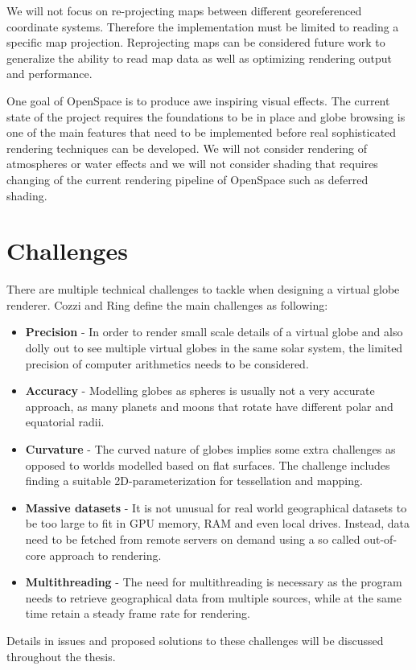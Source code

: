 We will not focus on re-projecting maps between different georeferenced coordinate systems. Therefore the implementation must be limited to reading a specific map projection. Reprojecting maps can be considered future work to generalize the ability to read map data as well as optimizing rendering output and performance.

One goal of OpenSpace is to produce awe inspiring visual effects. The current state of the project requires the foundations to be in place and globe browsing is one of the main features that need to be implemented before real sophisticated rendering techniques can be developed. We will not consider rendering of atmospheres or water effects and we will not consider shading that requires changing of the current rendering pipeline of OpenSpace such as deferred shading.

\section{Challenges}

There are multiple technical challenges to tackle when designing a virtual globe renderer. Cozzi and Ring \cite{cozzi11} define the main challenges as following:

\begin{itemize}

\item \textbf{Precision} - In order to render small scale details of a virtual globe and also dolly out to see multiple virtual globes in the same solar system, the limited precision of computer arithmetics needs to be considered.
\item \textbf{Accuracy} - Modelling globes as spheres is usually not a very accurate approach, as many planets and moons that rotate have different polar and equatorial radii.
\item \textbf{Curvature} - The curved nature of globes implies some extra challenges as opposed to worlds modelled based on flat surfaces. The challenge includes finding a suitable 2D-parameterization for tessellation and mapping.
\item \textbf{Massive datasets} - It is not unusual for real world geographical datasets to be too large to fit in GPU memory, RAM and even local drives. Instead, data need to be fetched from remote servers on demand using a so called out-of-core approach to rendering.
\item \textbf{Multithreading} - The need for multithreading is necessary as the program needs to retrieve geographical data from multiple sources, while at the same time retain a steady frame rate for rendering.

\end{itemize}

Details in issues and proposed solutions to these challenges will be discussed throughout the thesis.
